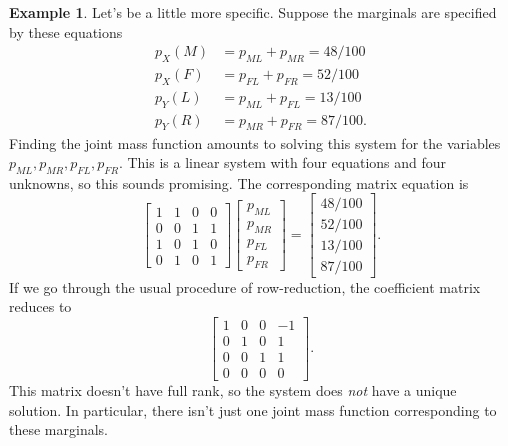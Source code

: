 \documentclass[12pt]{article}
\theoremstyle{plain}
\theoremstyle{definition}
\newtheorem{example}[theorem]{Example}
\theoremstyle{remark}
\begin{document}
\begin{example}
    Let's be a little more specific.
    Suppose the marginals are specified by these equations
    \begin{align*}
        p_X(M) &= p_{ML} + p_{MR} = 48/100\\
        p_X(F) &= p_{FL} + p_{FR} = 52/100\\
        p_Y(L) &= p_{ML} + p_{FL} = 13/100\\
        p_Y(R) &= p_{MR} + p_{FR} = 87/100.
    \end{align*}
    Finding the joint mass function amounts to solving this system for the variables $p_{ML}, p_{MR}, p_{FL}, p_{FR}$.
    This is a linear system with four equations and four unknowns, so this sounds promising.
    The corresponding matrix equation is
    \[
        \begin{bmatrix}
            1 & 1 & 0 & 0\\
            0 & 0 & 1 & 1\\
            1 & 0 & 1 & 0\\
            0 & 1 & 0 & 1
        \end{bmatrix}
        \begin{bmatrix}
            p_{ML}\\
            p_{MR}\\
            p_{FL}\\
            p_{FR}
        \end{bmatrix}
        =
        \begin{bmatrix}
            48/100\\
            52/100\\
            13/100\\
            87/100
        \end{bmatrix}.
    \]
    If we go through the usual procedure of row-reduction, the coefficient matrix reduces to
    \[
        \begin{bmatrix}
            1 & 0 & 0 &-1\\
            0 & 1 & 0 & 1\\
            0 & 0 & 1 & 1\\
            0 & 0 & 0 & 0
        \end{bmatrix}.
    \]
    This matrix doesn't have full rank, so the system does \emph{not} have a unique solution.
    In particular, there isn't just one joint mass function corresponding to these marginals.
\end{example}
\end{document}
